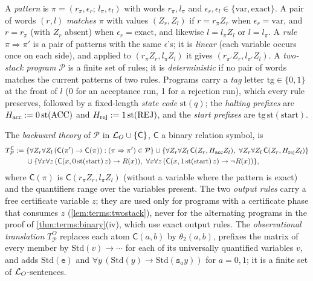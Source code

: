 \begin{definition}\label{def:terms:twostack}
A \emph{pattern} is $\pi=(r_\pi,\epsilon_r;\,l_\pi,\epsilon_l)$ with words $r_\pi,l_\pi$ and $\epsilon_r,\epsilon_l\in\{\mathrm{var},\mathrm{exact}\}$. A pair of words $(r,l)$ \emph{matches} $\pi$ with values $(Z_r,Z_l)$ if $r=r_\pi Z_r$ when $\epsilon_r=\mathrm{var}$, and $r=r_\pi$ (with $Z_r$ absent) when $\epsilon_r=\mathrm{exact}$, and likewise $l=l_\pi Z_l$ or $l=l_\pi$. A \emph{rule} $\pi\Rightarrow\pi'$ is a pair of patterns with the same $\epsilon$'s; it is \emph{linear} (each variable occurs once on each side), and applied to $(r_\pi Z_r,l_\pi Z_l)$ it gives $(r_{\pi'}Z_r,l_{\pi'}Z_l)$. A \emph{two-stack program} $\mathcal P$ is a finite set of rules; it is \emph{deterministic} if no pair of words matches the current patterns of two rules. Programs carry a \emph{tag} letter $\mathrm{tg}\in\{0,1\}$ at the front of $l$ (0 for an acceptance run, 1 for a rejection run), which every rule preserves, followed by a fixed-length \emph{state code} $\mathrm{st}(q)$; the \emph{halting prefixes} are $H_{\rm acc}:=0\,\mathrm{st}(\mathrm{ACC})$ and $H_{\rm rej}:=1\,\mathrm{st}(\mathrm{REJ})$, and the \emph{start prefixes} are $\mathrm{tg}\,\mathrm{st}(\mathrm{start})$.

The \emph{backward theory} of $\mathcal P$ in $\mathcal{L}_{O}\cup\{\mathsf C\}$, $\mathsf C$ a binary relation symbol, is
\begin{align*}
T^{\mathsf C}_{\mathcal P}:={}&\{\forall Z_r\forall Z_l\,(\mathsf C(\pi')\to\mathsf C(\pi)):(\pi\Rightarrow\pi')\in\mathcal P\}\cup\{\forall Z_r\forall Z_l\,\mathsf C(Z_r,H_{\rm acc}Z_l),\ \forall Z_r\forall Z_l\,\mathsf C(Z_r,H_{\rm rej}Z_l)\}\\
&\cup\{\forall x\forall z\,(\mathsf C(x,0\,\mathrm{st}(\mathrm{start})\,z)\to R(x)),\ \forall x\forall z\,(\mathsf C(x,1\,\mathrm{st}(\mathrm{start})\,z)\to\neg R(x))\},
\end{align*}
where $\mathsf C(\pi)$ is $\mathsf C(r_\pi Z_r,l_\pi Z_l)$ (without a variable where the pattern is exact) and the quantifiers range over the variables present. The two \emph{output rules} carry a free certificate variable $z$; they are used only for programs with a certificate phase that consumes $z$ (\cref{lem:terms:twostack}), never for the alternating programs in the proof of \cref{thm:terms:binary}(iv), which use exact output rules. The \emph{observational translation} $T^O_{\mathcal P}$ replaces each atom $\mathsf C(a,b)$ by $\theta_2(a,b)$, prefixes the matrix of every member by $\mathrm{Std}(v)\to\cdots$ for each of its universally quantified variables $v$, and adds $\mathrm{Std}(\mathtt e)$ and $\forall y\,(\mathrm{Std}(y)\to\mathrm{Std}(\mathtt s_ay))$ for $a=0,1$; it is a finite set of $\mathcal{L}_{O}$-sentences.
\end{definition}

